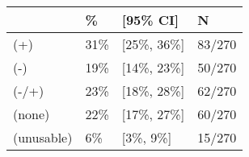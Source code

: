 \begin{tabular}{llll}
\hline
& \% & [95\% CI]  & N \\
\hline
(+) & 31\% & [25\%, 36\%] & 83/270\\
(-) & 19\% & [14\%, 23\%] & 50/270\\
(-/+) & 23\% & [18\%, 28\%] & 62/270\\
(none) & 22\% & [17\%, 27\%] & 60/270\\
(unusable) & 6\% & [3\%, 9\%] & 15/270\\
\hline
\end{tabular}
